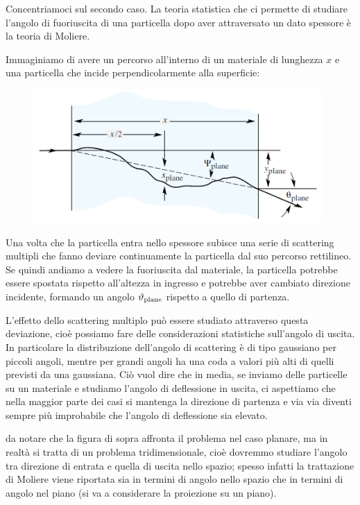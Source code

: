 Concentriamoci sul secondo caso. La teoria statistica che ci permette di studiare l'angolo di fuoriuscita di una particella dopo aver attraversato un dato spessore è la teoria di Moliere.

Immaginiamo di avere un percorso all'interno di un materiale di lunghezza $x$ e una particella che incide perpendicolarmente alla superficie:

\begin{figure}[H]
    \centering
    \includegraphics[width=11cm]{immagini/scattering_multiplo_1.png}
\end{figure}

Una volta che la particella entra nello spessore subisce una serie di scattering multipli che fanno deviare continuamente la particella dal suo percorso rettilineo. Se quindi andiamo a vedere la fuoriuscita dal materiale, la particella potrebbe essere spostata rispetto all'altezza in ingresso e potrebbe aver cambiato direzione incidente, formando un angolo $\vartheta_{\rm plane}$ rispetto a quello di partenza.

\vspace{0.2cm}L'effetto dello scattering multiplo può essere studiato attraverso questa deviazione, cioè possiamo fare delle considerazioni statistiche sull'angolo di uscita. In particolare la distribuzione dell'angolo di scattering è di tipo gaussiano per piccoli angoli, mentre per grandi angoli ha una coda a valori più alti di quelli previsti da una gaussiana. Ciò vuol dire che in media, se inviamo delle particelle su un materiale e studiamo l'angolo di deflessione in uscita, ci aspettiamo che nella maggior parte dei casi si mantenga la direzione di partenza e via via diventi sempre più improbabile che l'angolo di deflessione sia elevato.

\E da notare che la figura di sopra affronta il problema nel caso planare, ma in realtà si tratta di un problema tridimensionale, cioè dovremmo studiare l'angolo tra direzione di entrata e quella di uscita nello spazio; spesso infatti la trattazione di Moliere viene riportata sia in termini di angolo nello spazio che in termini di angolo nel piano (si va a considerare la proiezione su un piano).

